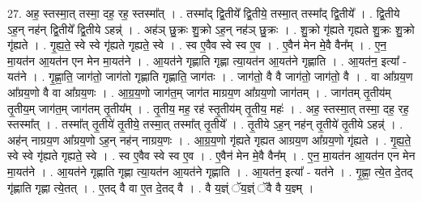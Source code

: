 \documentclass[17pt]{extarticle}
\begin{document}
27. अह॒ स्तस्मा॒त् तस्मा॒ दह॒ रह॒ स्तस्मा᳚त् । . तस्मा᳚द् द्वि॒तीये᳚ द्वि॒तीये॒ तस्मा॒त् तस्मा᳚द् द्वि॒तीये᳚ । . द्वि॒तीये ऽह॒न् नह॑न् द्वि॒तीये᳚ द्वि॒तीये ऽहन्न्॑ । . अह॑ञ् छु॒क्रः शु॒क्रो ऽह॒न् नह॑ञ् छु॒क्रः । . शु॒क्रो गृ॑ह्यते गृह्यते शु॒क्रः शु॒क्रो गृ॑ह्यते । . गृ॒ह्य॒ते॒ स्वे स्वे गृ॑ह्यते गृह्यते॒ स्वे । . स्व ए॒वैव स्वे स्व ए॒व । . ए॒वैन॑ मेन मे॒वै वैन᳚म् । . ए॒न॒ मा॒यत॑न आ॒यत॑न एन मेन मा॒यत॑ने । . आ॒यत॑ने गृह्णाति गृह्णा त्या॒यत॑न आ॒यत॑ने गृह्णाति । . आ॒यत॑न॒ इत्या᳚ - यत॑ने । . गृ॒ह्णा॒ति॒ जाग॑तो॒ जाग॑तो गृह्णाति गृह्णाति॒ जाग॑तः । . जाग॑तो॒ वै वै जाग॑तो॒ जाग॑तो॒ वै । . वा आ᳚ग्रय॒ण आ᳚ग्रय॒णो वै वा आ᳚ग्रय॒णः । . आ॒ग्र॒य॒णो जाग॑त॒म् जाग॑त माग्रय॒ण आ᳚ग्रय॒णो जाग॑तम् । . जाग॑तम् तृ॒तीय॑म् तृ॒तीय॒म् जाग॑त॒म् जाग॑तम् तृ॒तीय᳚म् । . तृ॒तीय॒ मह॒ रह॑ स्तृ॒तीय॑म् तृ॒तीय॒ महः॑ । . अह॒ स्तस्मा॒त् तस्मा॒ दह॒ रह॒ स्तस्मा᳚त् । . तस्मा᳚त् तृ॒तीये॑ तृ॒तीये॒ तस्मा॒त् तस्मा᳚त् तृ॒तीये᳚ । . तृ॒तीये ऽह॒न् नह॑न् तृ॒तीये॑ तृ॒तीये ऽहन्न्॑ । . अह॑न् नाग्रय॒ण आ᳚ग्रय॒णो ऽह॒न् नह॑न् नाग्रय॒णः । . आ॒ग्र॒य॒णो गृ॑ह्यते गृह्यत आग्रय॒ण आ᳚ग्रय॒णो गृ॑ह्यते । . गृ॒ह्य॒ते॒ स्वे स्वे गृ॑ह्यते गृह्यते॒ स्वे । . स्व ए॒वैव स्वे स्व ए॒व । . ए॒वैन॑ मेन मे॒वै वैन᳚म् । . ए॒न॒ मा॒यत॑न आ॒यत॑न एन मेन मा॒यत॑ने । . आ॒यत॑ने गृह्णाति गृह्णा त्या॒यत॑न आ॒यत॑ने गृह्णाति । . आ॒यत॑न॒ इत्या᳚ - यत॑ने । . गृ॒ह्णा॒ त्ये॒त दे॒तद् गृ॑ह्णाति गृह्णा त्ये॒तत् । . ए॒तद् वै वा ए॒त दे॒तद् वै । . वै य॒ज्ञ्ं ॅय॒ज्ञ्ं ॅवै वै य॒ज्ञ्म् । \newline
\end{document}
